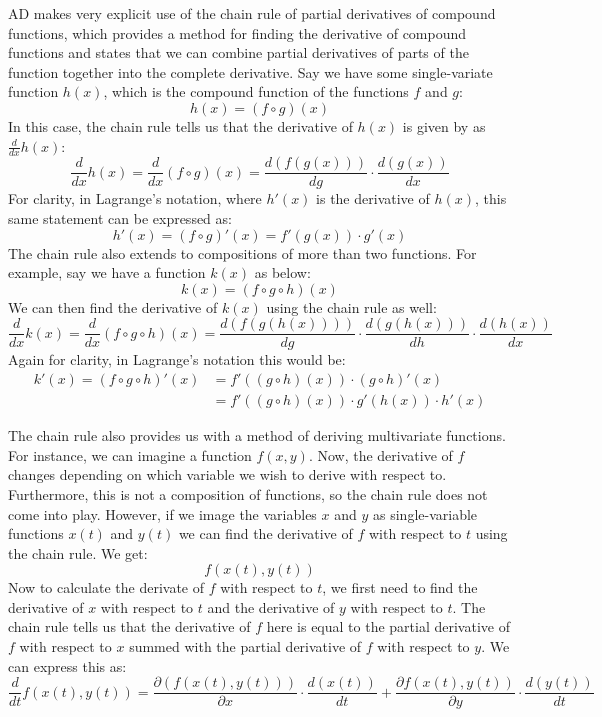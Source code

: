         AD makes very explicit use of the chain rule of partial derivatives of compound functions, which provides a method for finding the derivative of compound functions and states that we can combine partial derivatives of parts of the function together into the complete derivative.
        Say we have some single-variate function $h(x)$, which is the compound function of the functions $f$ and $g$:
        \[h(x)=(f\circ g)(x)\]
        In this case, the chain rule tells us that the derivative of $h(x)$ is given by as $\tfrac{d}{dx}h(x)$:
        \[\frac{d}{dx}h(x)=\frac{d}{dx}(f\circ g)(x)=\frac{d(f(g(x)))}{dg}\cdot\frac{d(g(x))}{dx}\]
        For clarity, in Lagrange's notation, where $h'(x)$ is the derivative of $h(x)$, this same statement can be expressed as:
        \[h'(x)=(f\circ g)'(x)=f'(g(x))\cdot g'(x)\]
        The chain rule also extends to compositions of more than two functions.
        For example, say we have a function $k(x)$ as below:
        \[k(x)=(f\circ g\circ h)(x)\]
        We can then find the derivative of $k(x)$ using the chain rule as well:
        \[\frac{d}{dx}k(x)=\frac{d}{dx}(f\circ g\circ h)(x)=\frac{d(f(g(h(x))))}{dg}\cdot\frac{d(g(h(x)))}{dh}\cdot\frac{d(h(x))}{dx}\]
        Again for clarity, in Lagrange's notation this would be:
        \begin{align*}
            k'(x)=(f\circ g\circ h)'(x)&=f'((g\circ h)(x))\cdot(g\circ h)'(x)\\
            &=f'((g\circ h)(x))\cdot g'(h(x))\cdot h'(x)
        \end{align*}

        The chain rule also provides us with a method of deriving multivariate functions.
        For instance, we can imagine a function $f(x,y)$.
        Now, the derivative of $f$ changes depending on which variable we wish to derive with respect to.
        Furthermore, this is not a composition of functions, so the chain rule does not come into play.
        However, if we image the variables $x$ and $y$ as single-variable functions $x(t)$ and $y(t)$ we can find the derivative of $f$ with respect to $t$ using the chain rule.
        We get:
        \[f(x(t),y(t))\]
        Now to calculate the derivate of $f$ with respect to $t$, we first need to find the derivative of $x$ with respect to $t$ and the derivative of $y$ with respect to $t$.
        The chain rule tells us that the derivative of $f$ here is equal to the partial derivative of $f$ with respect to $x$ summed with the partial derivative of $f$ with respect to $y$.
        We can express this as:
        \[\frac{d}{dt}f(x(t),y(t))=\frac{\partial(f(x(t), y(t)))}{\partial x}\cdot\frac{d(x(t))}{dt}+\frac{\partial f(x(t), y(t))}{\partial y}\cdot\frac{d(y(t))}{dt}\]

